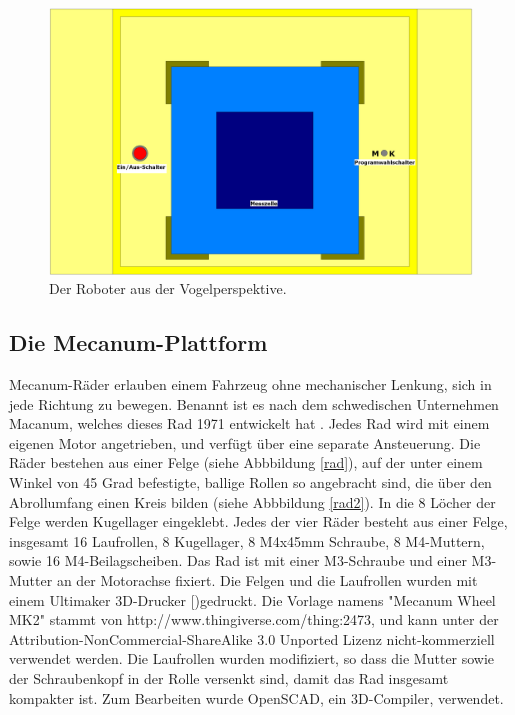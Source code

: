 \documentclass[a4paper,bibtotoc,oneside]{scrbook}
\begin{document}
\begin{figure}[htbp]
\centering
\includegraphics[width=125mm]{img/oben3.png}
\caption{Der Roboter aus der Vogelperspektive.}\label{oben}
\end{figure}
  

\subsection{Die Mecanum-Plattform}\thispagestyle{empty}
Mecanum-Räder erlauben einem Fahrzeug ohne mechanischer Lenkung, sich in jede Richtung zu bewegen. Benannt ist es nach dem schwedischen Unternehmen Macanum, welches dieses Rad 1971 entwickelt hat \cite{mecanum}. 
Jedes Rad wird mit einem eigenen Motor angetrieben, und verfügt über eine separate Ansteuerung. Die Räder bestehen aus einer Felge (siehe Abbbildung \ref{rad}), auf der unter einem Winkel von 45 Grad befestigte, ballige Rollen so angebracht sind, die über den Abrollumfang einen Kreis bilden (siehe Abbbildung \ref{rad2}). In die 8 Löcher der Felge werden Kugellager eingeklebt. Jedes der vier Räder besteht aus einer Felge, insgesamt 16 Laufrollen, 8 Kugellager, 8 M4x45mm Schraube, 8 M4-Muttern, sowie 16 M4-Beilagscheiben. 
Das Rad ist mit einer M3-Schraube und einer M3-Mutter an der Motorachse fixiert.
Die Felgen und die Laufrollen wurden mit einem Ultimaker 3D-Drucker [\cite{um})gedruckt. 
Die Vorlage namens "Mecanum Wheel MK2" stammt von http://www.thingiverse.com/thing:2473, und kann unter der Attribution-NonCommercial-ShareAlike 3.0 Unported Lizenz nicht-kommerziell verwendet werden.
Die Laufrollen wurden modifiziert, so dass die Mutter sowie der Schraubenkopf in der Rolle versenkt sind, damit das Rad insgesamt kompakter ist. Zum Bearbeiten wurde OpenSCAD, ein 3D-Compiler, verwendet. 
\end{document}
